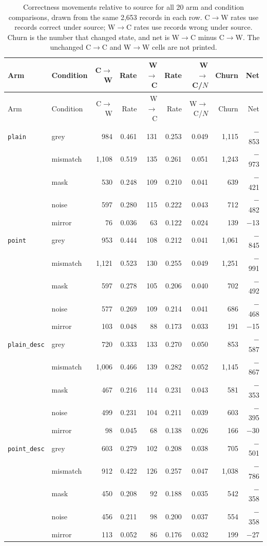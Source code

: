\begin{longtable}{llrrrrrrr}
\caption[Stage~1 correctness movements in every arm and condition]{Correctness
movements relative to source for all 20 arm and condition comparisons, drawn
from the same 2,653 records in each row. C$\rightarrow$W rates use records
correct under source; W$\rightarrow$C rates use records wrong under source.
Churn is the number that changed state, and net is W$\rightarrow$C minus
C$\rightarrow$W. The unchanged C$\rightarrow$C and W$\rightarrow$W cells are not
printed.}\label{tab:app-rq1-transitions}\\
\toprule
Arm & Condition & C$\rightarrow$W & Rate & W$\rightarrow$C & Rate & W$\rightarrow$C/$N$ & Churn & Net \\
\midrule
\endfirsthead
\toprule
Arm & Condition & C$\rightarrow$W & Rate & W$\rightarrow$C & Rate & W$\rightarrow$C/$N$ & Churn & Net \\
\midrule
\endhead
\texttt{plain} & grey & 984 & 0.461 & 131 & 0.253 & 0.049 & 1,115 & $-$853 \\
 & mismatch & 1,108 & 0.519 & 135 & 0.261 & 0.051 & 1,243 & $-$973 \\
 & mask & 530 & 0.248 & 109 & 0.210 & 0.041 & 639 & $-$421 \\
 & noise & 597 & 0.280 & 115 & 0.222 & 0.043 & 712 & $-$482 \\
 & mirror & 76 & 0.036 & 63 & 0.122 & 0.024 & 139 & $-$13 \\
\texttt{point} & grey & 953 & 0.444 & 108 & 0.212 & 0.041 & 1,061 & $-$845 \\
 & mismatch & 1,121 & 0.523 & 130 & 0.255 & 0.049 & 1,251 & $-$991 \\
 & mask & 597 & 0.278 & 105 & 0.206 & 0.040 & 702 & $-$492 \\
 & noise & 577 & 0.269 & 109 & 0.214 & 0.041 & 686 & $-$468 \\
 & mirror & 103 & 0.048 & 88 & 0.173 & 0.033 & 191 & $-$15 \\
\texttt{plain\_desc} & grey & 720 & 0.333 & 133 & 0.270 & 0.050 & 853 & $-$587 \\
 & mismatch & 1,006 & 0.466 & 139 & 0.282 & 0.052 & 1,145 & $-$867 \\
 & mask & 467 & 0.216 & 114 & 0.231 & 0.043 & 581 & $-$353 \\
 & noise & 499 & 0.231 & 104 & 0.211 & 0.039 & 603 & $-$395 \\
 & mirror & 98 & 0.045 & 68 & 0.138 & 0.026 & 166 & $-$30 \\
\texttt{point\_desc} & grey & 603 & 0.279 & 102 & 0.208 & 0.038 & 705 & $-$501 \\
 & mismatch & 912 & 0.422 & 126 & 0.257 & 0.047 & 1,038 & $-$786 \\
 & mask & 450 & 0.208 & 92 & 0.188 & 0.035 & 542 & $-$358 \\
 & noise & 456 & 0.211 & 98 & 0.200 & 0.037 & 554 & $-$358 \\
 & mirror & 113 & 0.052 & 86 & 0.176 & 0.032 & 199 & $-$27 \\
\bottomrule
\end{longtable}
